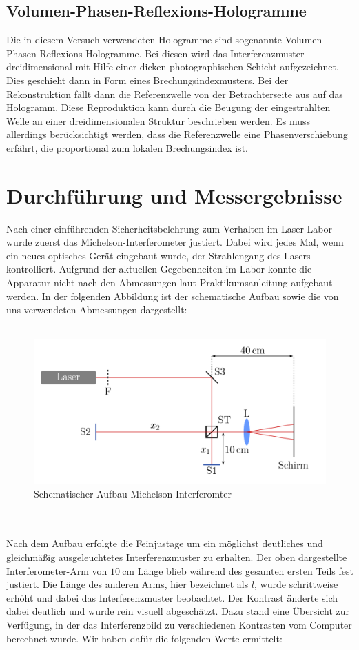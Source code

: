 \documentclass[german,  %
parskip=full,  %
]{scrartcl}
\begin{document}
\subsection{Volumen-Phasen-Reflexions-Hologramme}
Die in diesem Versuch verwendeten Hologramme sind sogenannte Volumen-Phasen-Reflexions-Hologramme. Bei diesen wird das Interferenzmuster dreidimensional mit Hilfe einer dicken photographischen Schicht aufgezeichnet. Dies geschieht dann in Form eines Brechungsindexmusters. 
\newline
Bei der Rekonstruktion fällt dann die Referenzwelle von der Betrachterseite aus auf das Hologramm. Diese Reproduktion kann durch die Beugung der eingestrahlten Welle an einer dreidimensionalen Struktur beschrieben werden. Es muss allerdings berücksichtigt werden, dass die Referenzwelle eine Phasenverschiebung erfährt, die proportional zum lokalen Brechungsindex ist.

\section{Durchführung und Messergebnisse}
Nach einer einführenden Sicherheitsbelehrung zum Verhalten im Laser-Labor wurde zuerst das Michelson-Interferometer justiert. Dabei wird jedes Mal, wenn ein neues optisches Gerät eingebaut wurde, der Strahlengang des Lasers kontrolliert. Aufgrund der aktuellen Gegebenheiten im Labor konnte die Apparatur nicht nach den Abmessungen laut Praktikumsanleitung aufgebaut werden. In der folgenden Abbildung ist der schematische Aufbau sowie die von uns verwendeten Abmessungen dargestellt:
\\\\
\begin{figure}[h!]
\centering
\includegraphics[scale=0.4]{a2.png}
\caption{Schematischer Aufbau Michelson-Interferomter}
\end{figure}
\\\\
Nach dem Aufbau erfolgte die Feinjustage um ein möglichst deutliches und gleichmäßig ausgeleuchtetes Interferenzmuster zu erhalten. Der oben dargestellte Interferometer-Arm von \(10 \ \mathrm{cm}\) Länge blieb während des gesamten ersten Teils fest justiert. Die Länge des anderen Arms, hier bezeichnet als $l$, wurde schrittweise erhöht und dabei das Interferenzmuster beobachtet. Der Kontrast änderte sich dabei deutlich und wurde rein visuell abgeschätzt. Dazu stand eine Übersicht zur Verfügung, in der das Interferenzbild zu verschiedenen Kontrasten vom Computer berechnet wurde. Wir haben dafür die folgenden Werte ermittelt: 
\end{document}
